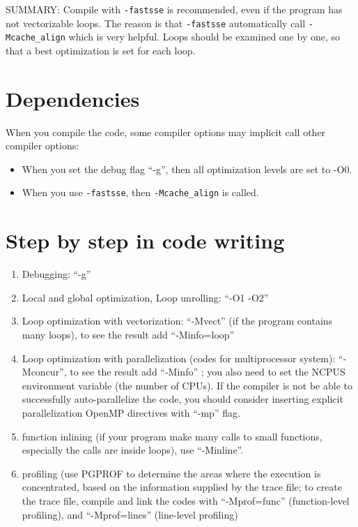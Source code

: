 SUMMARY: Compile with \verb!-fastsse! is recommended, even if the
program has not vectorizable loops. The reason is that \verb!-fastsse!
automatically call \verb!-Mcache_align! which is very helpful. Loops
should be examined one by one, so that a best optimization is set for
each loop. 

\section{Dependencies}
\label{sec:dependencies}

When you compile the code, some compiler options may implicit call
other compiler options:
\begin{itemize}
\item When you set the debug flag ``-g'', then all optimization levels
  are set to -O0.

\item When you use \verb!-fastsse!, then \verb!-Mcache_align! is
  called.
\end{itemize}

\section{Step by step in code writing}
\label{sec:step-step}


\begin{enumerate}
\item Debugging: ``-g''
\item Local and global optimization, Loop unrolling: ``-O1 -O2''
\item Loop optimization with vectorization: ``-Mvect'' (if the program
  contains many loops), to see the result add ``-Minfo=loop''
\item Loop optimization with parallelization (codes for multiprocessor
  system): ``-Mconcur'', to see the result add ``-Minfo'' ; you also
  need to set the NCPUS environment variable (the number of CPUs). If
  the compiler is not be able to successfully auto-parallelize the
  code, you should consider inserting explicit parallelization OpenMP
  directives with ``-mp'' flag.
\item function inlining (if your program make many calls to small
  functions, especially the calls are inside loops), use ``-Minline''.
\item profiling (use PGPROF to determine the areas where the execution
  is concentrated, based on the information supplied by the trace
  file; to create the trace file, compile and link the codes with
  ``-Mprof=func'' (function-level profiling), and ``-Mprof=lines''
  (line-level profiling)
\end{enumerate}


